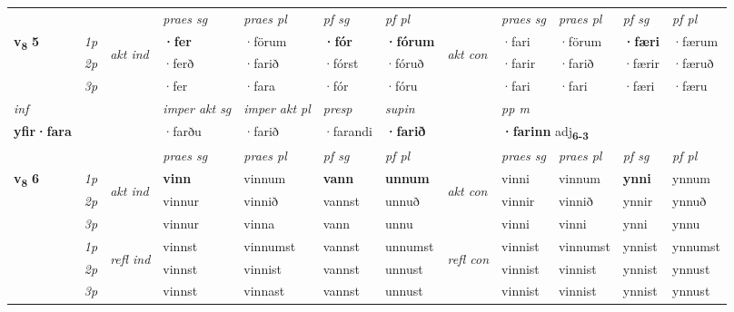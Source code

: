 \begin{longtable}[l]{X>{\footnotesize\itshape}llXXXXlXXXX}
 & &   & \textit{praes sg}  & \textit{praes pl}    & \textit{ pf sg} & \textit{pf pl} & & \textit{praes sg}  & \textit{praes pl}    & \textit{pf sg} & \textit{pf pl }  \\ \cmidrule{4-7} \cmidrule{9-12}
 \multirow{2}{*}{{{\textbf{v{\textsubscript{8}}} \Large{\textbf{5}}}}}  & 1p & \multirow{3}{*}{\begin{turn}{90}\textit{akt ind}\end{turn}} & \textbf{·fer} & ·förum & \textbf{·fór} & \textbf{·fórum} & \multirow{3}{*}{\begin{turn}{90}\textit{akt con}\end{turn}} &·fari & ·förum & \textbf{·færi} & ·færum\\*
 & 2p &  &  ·ferð  & ·farið & ·fórst & ·fóruð & & ·farir & ·farið & ·færir & ·færuð \\*
 & 3p &  & ·fer & ·fara & ·fór & ·fóru & & ·fari & ·fari& ·færi & ·færu \\*
\cmidrule{4-7} \cmidrule{9-12}

   {\textit{inf}} & &  & \textit{imper akt sg} & \textit{imper akt pl}   & \textit{presp} & \textit{supin}  && \textit{pp m} \\*
  {\textbf{yfir\allowbreak ·fara}} & && ·farðu  & ·farið   & ·farandi &  \textbf{·farið}  && \multicolumn{2}{l}{\textbf{·farinn} adj\textbf{\textsubscript{6-3}}} \\*

\midrule

 & &   & \textit{praes sg}  & \textit{praes pl}    & \textit{ pf sg} & \textit{pf pl} & & \textit{praes sg}  & \textit{praes pl}    & \textit{pf sg} & \textit{pf pl }  \\ \cmidrule{4-7} \cmidrule{9-12}
 \multirow{2}{*}{{{\textbf{v{\textsubscript{8}}} \Large{\textbf{6}}}}}  & 1p & \multirow{3}{*}{\begin{turn}{90}\textit{akt ind}\end{turn}} & \textbf{vinn} & vinnum & \textbf{vann} & \textbf{unnum} & \multirow{3}{*}{\begin{turn}{90}\textit{akt con}\end{turn}} &vinni & vinnum & \textbf{ynni} & ynnum\\*
 & 2p &  &  vinnur  & vinnið & vannst & unnuð & & vinnir & vinnið & ynnir & ynnuð \\*
 & 3p &  & vinnur & vinna & vann & unnu & & vinni & vinni& ynni & ynnu \\*
\cmidrule{4-7} \cmidrule{9-12}
 & 1p & \multirow{3}{*}{\begin{turn}{90}\textit{refl ind}\end{turn}}  & vinnst & vinnumst & vannst & unnumst & \multirow{3}{*}{\begin{turn}{90}\textit{refl con}\end{turn}}  &vinnist & vinnumst & ynnist & ynnumst \\*
 & 2p &  & vinnst & vinnist & vannst & unnust & &vinnist & vinnist & ynnist & ynnust \\*
 & 3p  & & vinnst & vinnast & vannst & unnust & & vinnist & vinnist& ynnist & ynnust \\*
\cmidrule{4-7} \cmidrule{9-12}


\end{longtable}

